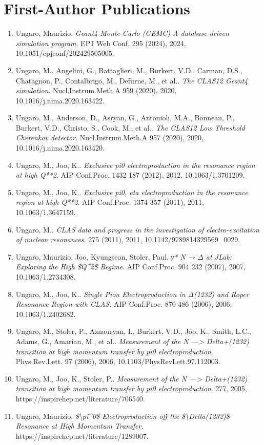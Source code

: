\section*{First-Author Publications}
\begin{enumerate}
\item Ungaro, Maurizio. \textit{Geant4 Monte-Carlo (GEMC) A database-driven simulation program}. EPJ Web Conf. 295 (2024), 2024, 10.1051/epjconf/202429505005.
\item Ungaro, M., Angelini, G., Battaglieri, M., Burkert, V.D., Carman, D.S., Chatagnon, P., Contalbrigo, M., Defurne, M., et al.. \textit{The CLAS12 Geant4 simulation}. Nucl.Instrum.Meth.A 959 (2020), 2020, 10.1016/j.nima.2020.163422.
\item Ungaro, M., Anderson, D., Asryan, G., Antonioli, M.A., Bonneau, P., Burkert, V.D., Christo, S., Cook, M., et al.. \textit{The CLAS12 Low Threshold Cherenkov detector}. Nucl.Instrum.Meth.A 957 (2020), 2020, 10.1016/j.nima.2020.163420.
\item Ungaro, M., Joo, K.. \textit{Exclusive pi0 electroproduction in the resonance region at high Q**2}. AIP Conf.Proc. 1432 187 (2012), 2012, 10.1063/1.3701209.
\item Ungaro, M., Joo, K.. \textit{Exclusive pi0, eta electroproduction in the resonance region at high Q**2}. AIP Conf.Proc. 1374 357 (2011), 2011, 10.1063/1.3647159.
\item Ungaro, M.. \textit{CLAS data and progress in the investigation of electro-excitation of nucleon resonances}. 275 (2011), 2011, 10.1142/9789814329569\_0029.
\item Ungaro, Maurizio, Joo, Kyungseon, Stoler, Paul. \textit{γ* N → Δ at JLab: Exploring the High \$Q\textasciicircum{}2\$ Regime}. AIP Conf.Proc. 904 232 (2007), 2007, 10.1063/1.2734308.
\item Ungaro, M., Joo, K.. \textit{Single Pion Electroproduction in Δ(1232) and Roper Resonance Region with CLAS}. AIP Conf.Proc. 870 486 (2006), 2006, 10.1063/1.2402682.
\item Ungaro, M., Stoler, P., Aznauryan, I., Burkert, V.D., Joo, K., Smith, L.C., Adams, G., Amarian, M., et al.. \textit{Measurement of the N ---> Delta+(1232) transition at high momentum transfer by pi0 electroproduction}. Phys.Rev.Lett. 97 (2006), 2006, 10.1103/PhysRevLett.97.112003.
\item Ungaro, M., Joo, K., Stoler, P.. \textit{Measurement of the N ---> Delta+(1232) transition at high momentum transfer by pi0 electroproduction}. 277, 2005, https://inspirehep.net/literature/706540.
\item Ungaro, Maurizio. \textit{\$\textbackslash{}pi\textasciicircum{}0\$ Electroproduction off the \$\textbackslash{}Delta(1232)\$ Resonance at High Momentum Transfer}. https://inspirehep.net/literature/1289007.
\end{enumerate}

